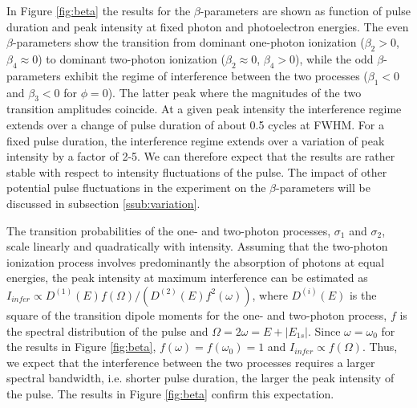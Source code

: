 In Figure \ref{fig:beta} the results for the \textbf{$\beta$}-parameters are shown as function of pulse duration and peak intensity at fixed photon and photoelectron energies. The even $\beta$-parameters show the transition from dominant one-photon ionization ($\beta_2 > 0$, $\beta_4 \approx 0$) to dominant two-photon ionization ($\beta_2 \approx 0$, $\beta_4 > 0$), while the odd $\beta$-parameters exhibit the regime of interference between the two processes ($\beta_1 < 0$ and $\beta_3 < 0$ for $\phi=0$). The latter peak where the magnitudes of the two transition amplitudes coincide. At a given peak intensity the interference regime extends over a change of pulse duration of about 0.5 cycles at FWHM. For a fixed pulse duration, the interference regime extends over a variation of peak intensity by a factor of 2-5. We can therefore expect that the results are rather stable with respect to intensity fluctuations of the pulse. The impact of other potential pulse fluctuations in the experiment on the $\beta$-parameters will be discussed in subsection
\ref{ssub:variation}.

The transition probabilities of the one- and two-photon processes, $\sigma_1$ and $\sigma_2$, scale linearly and quadratically with intensity. Assuming that the two-photon ionization process involves predominantly the absorption of photons at equal energies, the peak intensity at maximum interference can be estimated as $I_{infer} \propto D^{(1)}(E)f(\Omega)/(D^{(2)}(E)f^2(\omega))$, where $D^{(i)}(E)$ is the square of the transition dipole moments for the one- and two-photon process, $f$ is the spectral distribution of the pulse and $\Omega = 2\omega = E + |E_{1s}|$. Since $\omega = \omega_0$ for the results in Figure \ref{fig:beta}, $f(\omega) = f(\omega_0) = 1$ and $I_{infer} \propto f(\Omega)$. Thus, we expect that the interference between the two processes requires a larger spectral bandwidth, i.e. shorter pulse duration, the larger the peak intensity of the pulse. The results in Figure \ref{fig:beta} confirm this expectation.

